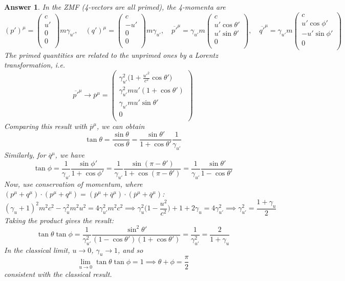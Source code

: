 \documentclass[a4paper]{article}
\theoremstyle{new2}
\newtheorem{ans}{Answer}[section]
\theoremstyle{new}
\begin{document}
\begin{ans}
In the ZMF (4-vectors are all primed), the 4-momenta are
$$(p')^\mu=\begin{pmatrix}c\\u'\\0\\0\\\end{pmatrix}m\gamma_{u'},\quad (q')^\mu=\begin{pmatrix}c\\-u'\\0\\0\\\end{pmatrix}m\gamma_{u'},\quad\overline{p'}^\mu=\gamma_{u'}m\begin{pmatrix}c\\u'\cos\theta'\\u'\sin\theta'\\0\\\end{pmatrix},\quad \overline{q'}^\mu=\gamma_{u'}m\begin{pmatrix}c\\u'\cos\phi'\\-u'\sin\phi'\\0\\\end{pmatrix}$$
The primed quantities are related to the unprimed ones by a Lorentz transformation, i.e.
$$\overline{p'}^\mu\rightarrow\overline{p}^\mu=\begin{pmatrix}\gamma_{u'}^2\bigg(1+\frac{u'^2}{c^2}\cos\theta'\bigg)\\\gamma_{u'}^2mu'(1+\cos\theta')\\\gamma_{u'}mu'\sin\theta'\\0\\\end{pmatrix}$$
Comparing this result with $\overline{p}^\mu$, we can obtain
$$\tan\theta=\frac{\sin\theta}{\cos\theta}=\frac{\sin\theta'}{1+\cos\theta'}\frac{1}{\gamma_{u'}}$$
Similarly, for $\overline{q}^\mu$, we have
$$\tan\phi=\frac{1}{\gamma_{u'}}\frac{\sin\phi'}{1+\cos\phi'}=\frac{1}{\gamma_{u'}}\frac{\sin(\pi-\theta')}{1+\cos(\pi-\theta')}=\frac{1}{\gamma_{u'}}\frac{\sin\theta'}{1-\cos\theta'}$$
Now, use conservation of momentum, where $(p^\mu+q^\mu)\cdot(p^\mu+q^\mu)=(\overline{p}^\mu+\overline{q}^\mu)\cdot(\overline{p}^\mu+\overline{q}^\mu)$:
$$(\gamma_u+1)^2m^2c^2-\gamma_u^2m^2u^2=4\gamma_{u'}^2m^2c^2\implies\gamma_u^2\bigg(1-\frac{u^2}{c^2}\bigg)+1+2\gamma_u=4\gamma_{u'}^2\implies\gamma_{u'}^2=\frac{1+\gamma_u}{2}$$
Taking the product gives the result:
$$\tan\theta\tan\phi=\frac{1}{\gamma_{u'}^2}\frac{\sin^2\theta'}{(1-\cos\theta')(1+\cos\theta')}=\frac{1}{\gamma_{u'}^2}=\frac{2}{1+\gamma_u}$$
In the classical limit, $u\rightarrow 0$, $\gamma_u\rightarrow1$, and so 
$$\lim_{u\rightarrow 0}\tan\theta\tan\phi=1\implies\theta+\phi=\frac{\pi}{2}$$
consistent with the classical result.
\end{ans}
\end{document}
